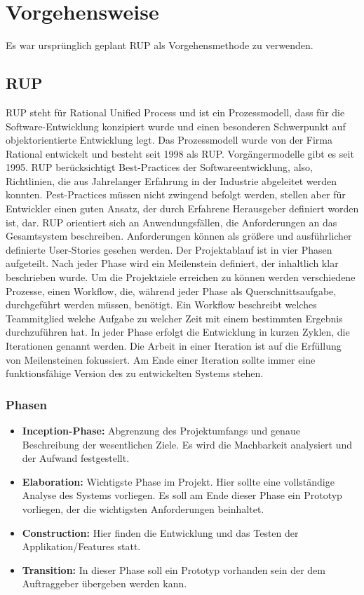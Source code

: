 \chapter{Vorgehensweise}
\reiter

	Es war ursprünglich geplant RUP als Vorgehensmethode zu verwenden. 

	\section{RUP}
	
	RUP steht für Rational Unified Process und ist ein Prozessmodell, dass für die Software-Entwicklung konzipiert wurde und einen besonderen Schwerpunkt auf objektorientierte Entwicklung legt. Das Prozessmodell wurde von der Firma Rational entwickelt und besteht seit 1998 als RUP. Vorgängermodelle gibt es seit 1995. 
RUP berücksichtigt Best-Practices der Softwareentwicklung, also, Richtlinien, die aus Jahrelanger Erfahrung in der Industrie abgeleitet werden konnten. Pest-Practices müssen nicht zwingend befolgt werden, stellen aber für Entwickler einen guten Ansatz, der durch Erfahrene Herausgeber definiert worden ist, dar. 
RUP orientiert sich an Anwendungsfällen, die Anforderungen an das Gesamtsystem beschreiben. Anforderungen können als größere und ausführlicher definierte User-Stories gesehen werden.  
Der Projektablauf ist in vier Phasen aufgeteilt. Nach jeder Phase wird ein Meilenstein definiert, der inhaltlich klar beschrieben wurde.
Um die Projektziele erreichen zu können werden verschiedene Prozesse, einen Workflow, die, während jeder Phase als Querschnittsaufgabe, durchgeführt werden müssen, benötigt. Ein Workflow beschreibt welches Teammitglied welche Aufgabe zu welcher Zeit mit einem bestimmten Ergebnis durchzuführen hat.
In jeder Phase erfolgt die Entwicklung in kurzen Zyklen, die Iterationen genannt werden. Die Arbeit in einer Iteration ist auf die Erfüllung von Meilensteinen fokussiert. Am Ende einer Iteration sollte immer eine funktionsfähige Version des zu entwickelten Systems stehen. 

	\subsection{Phasen}
	\begin{itemize}
		\item \textbf{Inception-Phase:} Abgrenzung des Projektumfangs und genaue Beschreibung der wesentlichen Ziele. Es wird die Machbarkeit analysiert und der Aufwand festgestellt.
		\item \textbf{Elaboration:} Wichtigste Phase im Projekt. Hier sollte eine vollständige Analyse des Systems vorliegen. Es soll am Ende dieser Phase ein Prototyp vorliegen, der die wichtigsten Anforderungen beinhaltet.
		\item \textbf{Construction:} Hier finden die Entwicklung und das Testen der Applikation/Features statt.
		\item \textbf{Transition:} In dieser Phase soll ein Prototyp vorhanden sein der dem Auftraggeber übergeben werden kann. 
	\end{itemize}
	
